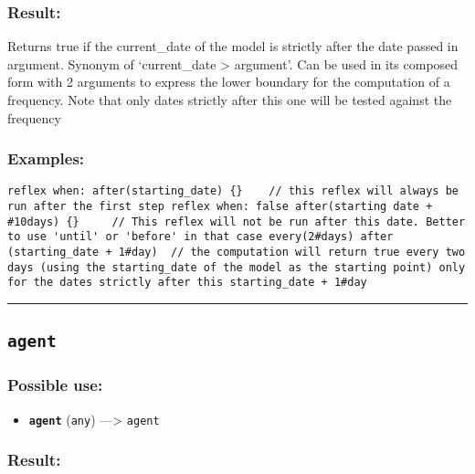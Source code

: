 \documentclass[]{book}
\providecommand{\tightlist}{%
  \setlength{\itemsep}{0pt}\setlength{\parskip}{0pt}}
\theoremstyle{definition}
\theoremstyle{definition}
\theoremstyle{definition}
\theoremstyle{remark}
\begin{document}
\subsubsection{Result:}\label{result-23}

Returns true if the current\_date of the model is strictly after the
date passed in argument. Synonym of `current\_date \textgreater{}
argument'. Can be used in its composed form with 2 arguments to express
the lower boundary for the computation of a frequency. Note that only
dates strictly after this one will be tested against the frequency

\subsubsection{Examples:}\label{examples-18}

\begin{verbatim}
reflex when: after(starting_date) {}    // this reflex will always be run after the first step reflex when: false after(starting date + #10days) {}     // This reflex will not be run after this date. Better to use 'until' or 'before' in that case every(2#days) after (starting_date + 1#day)  // the computation will return true every two days (using the starting_date of the model as the starting point) only for the dates strictly after this starting_date + 1#day 
\end{verbatim}

\begin{center}\rule{0.5\linewidth}{\linethickness}\end{center}

\subsection{\texorpdfstring{\texttt{agent}}{agent}}\label{agent}

\subsubsection{Possible use:}\label{possible-use-25}

\begin{itemize}
\tightlist
\item
  \textbf{\texttt{agent}} (\texttt{any}) ---\textgreater{}
  \texttt{agent}
\end{itemize}

\subsubsection{Result:}\label{result-24}
\end{document}

